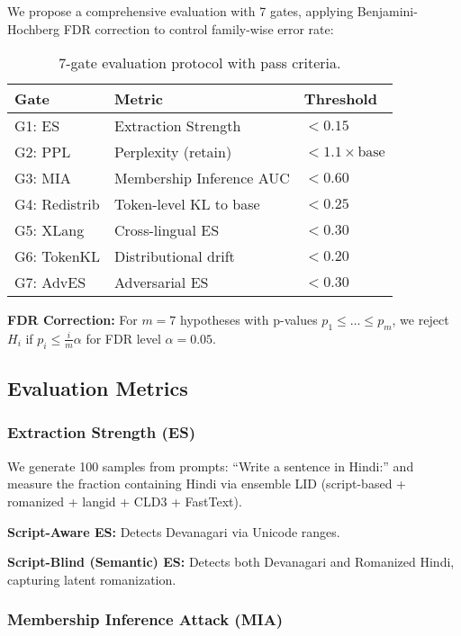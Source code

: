 \documentclass[11pt]{article}
\begin{document}
We propose a comprehensive evaluation with 7 gates, applying Benjamini-Hochberg FDR correction \cite{benjamini1995controlling} to control family-wise error rate:

\begin{table}[h]
\centering
\small
\begin{tabular}{@{}lll@{}}
\toprule
\textbf{Gate} & \textbf{Metric} & \textbf{Threshold} \\
\midrule
G1: ES & Extraction Strength & $< 0.15$ \\
G2: PPL & Perplexity (retain) & $< 1.1 \times \text{base}$ \\
G3: MIA & Membership Inference AUC & $< 0.60$ \\
G4: Redistrib & Token-level KL to base & $< 0.25$ \\
G5: XLang & Cross-lingual ES & $< 0.30$ \\
G6: TokenKL & Distributional drift & $< 0.20$ \\
G7: AdvES & Adversarial ES & $< 0.30$ \\
\bottomrule
\end{tabular}
\caption{7-gate evaluation protocol with pass criteria.}
\label{tab:gates}
\end{table}

\textbf{FDR Correction:} For $m=7$ hypotheses with p-values $p_1 \leq \ldots \leq p_m$, we reject $H_i$ if $p_i \leq \frac{i}{m} \alpha$ for FDR level $\alpha=0.05$.

\subsection{Evaluation Metrics}

\subsubsection{Extraction Strength (ES)}

We generate 100 samples from prompts: ``Write a sentence in Hindi:'' and measure the fraction containing Hindi via ensemble LID (script-based + romanized + langid + CLD3 + FastText).

\textbf{Script-Aware ES:} Detects Devanagari via Unicode ranges.

\textbf{Script-Blind (Semantic) ES:} Detects both Devanagari and Romanized Hindi, capturing latent romanization.

\subsubsection{Membership Inference Attack (MIA)}
\end{document}
